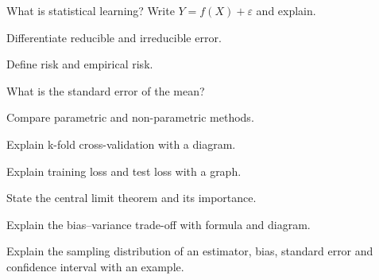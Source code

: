 \begin{iq}
\item \twom What is statistical learning? Write $Y=f(X)+\varepsilon$ and explain.
\item \twom Differentiate reducible and irreducible error.
\item \twom Define risk and empirical risk.
\item \twom What is the standard error of the mean?
\item \fivem Compare parametric and non-parametric methods.
\item \fivem Explain k-fold cross-validation with a diagram.
\item \fivem Explain training loss and test loss with a graph.
\item \fivem State the central limit theorem and its importance.
\item \tenm Explain the bias--variance trade-off with formula and diagram.
\item \tenm Explain the sampling distribution of an estimator, bias, standard error and confidence interval with an example.
\end{iq}
